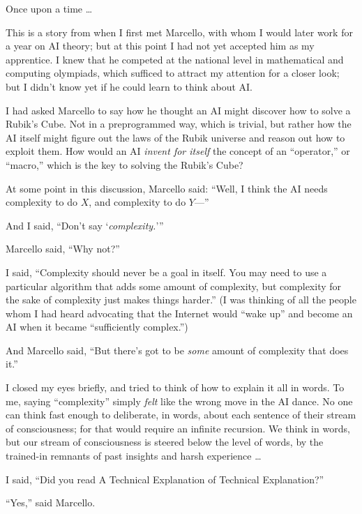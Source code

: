 \myendsectiontext


{
 Once upon a time \ldots }

{
 This is a story from when I first met Marcello, with whom I would
later work for a year on AI theory; but at this point I had not yet
accepted him as my apprentice. I knew that he competed at the national
level in mathematical and computing olympiads, which sufficed to
attract my attention for a closer look; but I didn't
know yet if he could learn to think about AI.}

{
 I had asked Marcello to say how he thought an AI might discover
how to solve a Rubik's Cube. Not in a preprogrammed
way, which is trivial, but rather how the AI itself might figure out
the laws of the Rubik universe and reason out how to exploit them. How
would an AI \textit{invent for itself} the concept of an
``operator,'' or
``macro,'' which is the key to
solving the Rubik's Cube?}

{
 At some point in this discussion, Marcello said:
``Well, I think the AI needs complexity to do $X$, and
complexity to do $Y$---''}

{
 And I said, ``Don't say
`\textit{complexity.}'''}

{
 Marcello said, ``Why not?''}

{
 I said, ``Complexity should never be a goal in
itself. You may need to use a particular algorithm that adds some
amount of complexity, but complexity for the sake of complexity just
makes things harder.'' (I was thinking of all the
people whom I had heard advocating that the Internet would
``wake up'' and become an AI when it
became ``sufficiently complex.'')}

{
 And Marcello said, ``But there's
got to be \textit{some} amount of complexity that does
it.''}

{
 I closed my eyes briefly, and tried to think of how to explain it
all in words. To me, saying
``complexity'' simply \textit{felt}
like the wrong move in the AI dance. No one can think fast enough to
deliberate, in words, about each sentence of their stream of
consciousness; for that would require an infinite recursion. We think
in words, but our stream of consciousness is steered below the level of
words, by the trained-in remnants of past insights and harsh experience
\ldots}

{
 I said, ``Did you read A Technical Explanation of
Technical Explanation?''}

{
 ``Yes,'' said Marcello.}

